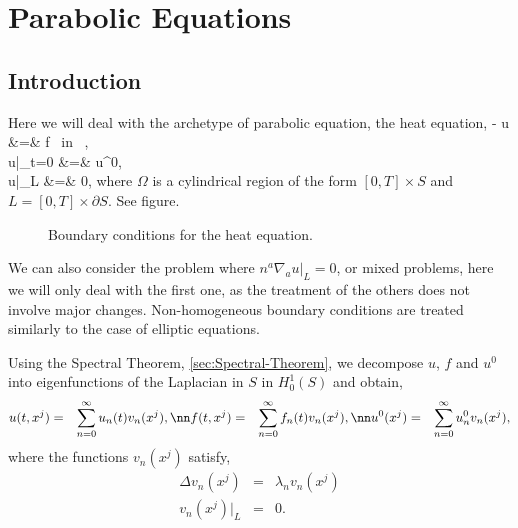 

\chapter{Parabolic Equations}

\section{Introduction}

Here we will deal with the archetype of parabolic equation, the heat equation,
\beq
{\dip
{}
 - \Delta u &=& f \mbox{ in }
\Omega,\\ 
u|_{t=0} &=& u^0,\\
u|_L &=& 0, 
\earr
}
\eeq 
where $\Omega $ is a cylindrical region of the form $[0,T] \times S$ and $L = [0,T] \times \partial S$.  
See figure.

\espa 
\begin{figure}[htbp]
  \begin{center}
    \caption{Boundary conditions for the heat equation.}
    \label{fig:14_1}
  \end{center}
\end{figure}

We can also consider the problem where $n^a\nabla_a u |_L =0$, 
or mixed problems, here we will only deal with the first one, as the treatment of the others does not involve major changes. 
Non-homogeneous boundary conditions are treated similarly to the case of elliptic equations.

Using the Spectral Theorem, \ref{sec:Spectral-Theorem}, we decompose $u$, $f$ and $u^0$ into eigenfunctions of the Laplacian in $S$ in $H^1_0(S)$ and obtain,
\begin{eqnarray*}
u(t,x^j) &=& \sum^{\infty}_{n=0} u_n(t) v_n(x^j), \nn
f(t,x^j)  &=& \sum^{\infty}_{n=0} f_n(t) v_n(x^j), \nn
u^0(x^j) &=& \sum^{\infty}_{n=0} u^0_n v_n(x^j), 
\end{eqnarray*}
%
where the functions $v_n(x^j)$ satisfy,
\begin{eqnarray*}
\Delta v_n(x^j) &=& \lambda_{n} v_n(x^j) \\
v_n(x^j)|_{L} &=& 0.
\end{eqnarray*}

